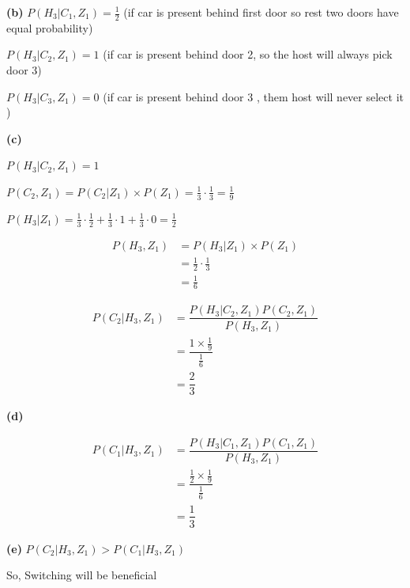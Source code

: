 \documentclass{article}
\theoremstyle{remark}
\begin{document}
\hspace{2.5em} \textbf{(b)}
$P(H_3|C_1, Z_1)=\frac{1}{2}$ (if car is present behind first door so rest two doors have equal probability)\par
$P(H_3|C_2, Z_1)=1$ (if car is present behind door 2, so the host will always pick door 3) \par
$P(H_3|C_3, Z_1)=0$ (if  car is present behind door 3 , them host will never select it )\par


\hspace{2.5em} \textbf{(c)}
\begin {center}
$P(H_3|C_2, Z_1)=1 $ \par
$ P(C_2,Z_1)=P(C_2|Z_1) \times P(Z_1)=\frac{1}{3} \cdot \frac{1}{3}=\frac{1}{9}$\par
$ P(H_3|Z_1)= \frac{1}{3}\cdot\frac{1}{2}+\frac{1}{3}\cdot1+\frac{1}{3}\cdot0=\frac{1}{2} $ \par
\begin {align*}
P(H_3,Z_1) &= P(H_3|Z_1) \times P(Z_1) \\
&=\frac{1}{2} \cdot \frac{1}{3}\\
&= \frac{1}{6}
\end {align*}

\begin{align*}
    P(C_2|H_3,Z_1) & = \dfrac{P(H_3|C_2,Z_1)P(C_2,Z_1)}{P(H_3,Z_1)} \\
                   & = \dfrac{1 \times \frac{1}{9}}{\frac{1}{6}}    \\
                   & = \dfrac{2}{3}
\end{align*}


\end {center}

\hspace{2.5em} \textbf{(d)}
\begin{center}
    \begin{align*}
        P(C_1|H_3,Z_1) & = \dfrac{P(H_3|C_1,Z_1)P(C_1,Z_1)}{P(H_3,Z_1)}       \\
                       & =\dfrac{\frac{1}{2} \times \frac{1}{9}}{\frac{1}{6}} \\
                       & = \dfrac{1}{3}
    \end{align*}



\end{center}


\hspace{2.5em} \textbf{(e)}
$P(C_2|H_3,Z_1) > P(C_1|H_3,Z_1)$ \par
\hspace{3.0em}So, Switching will be beneficial \par
\end{document}
